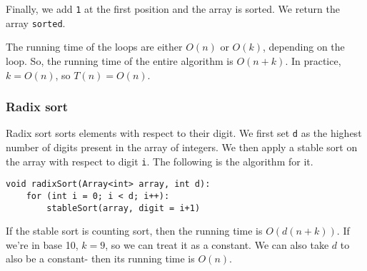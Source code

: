 \documentclass[a4paper, openany]{memoir}
\begin{document}
Finally, we add \texttt{1} at the first position and the array is sorted. We return the array \texttt{sorted}.
\begin{center}
\end{center}
The running time of the loops are either $O(n)$ or $O(k)$, depending on the loop. So, the running time of the entire algorithm is $O(n + k)$. In practice, $k = O(n)$, so $T(n) = O(n)$.

\subsubsection{Radix sort}
Radix sort sorts elements with respect to their digit. We first set \texttt{d} as the highest number of digits present in the array of integers. We then apply a stable sort on the array with respect to digit \texttt{i}. The following is the algorithm for it.
\begin{lstlisting}[language=pseudocode]
void radixSort(Array<int> array, int d):
    for (int i = 0; i < d; i++):
        stableSort(array, digit = i+1)
\end{lstlisting}
If the stable sort is counting sort, then the running time is $O(d(n + k))$. If we're in base 10, $k = 9$, so we can treat it as a constant. We can also take $d$ to also be a constant- then its running time is $O(n)$.
\end{document}
